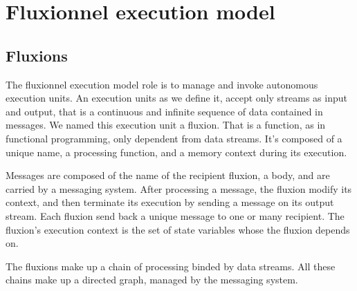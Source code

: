\section{Fluxionnel execution model}

\subsection{Fluxions}

The fluxionnel execution model role is to manage and invoke autonomous execution units.
An execution units as we define it, accept only streams as input and output, that is a continuous and infinite sequence of data contained in messages.
We named this execution unit a fluxion.
That is a function, as in functional programming, only dependent from data streams.
It's composed of a unique name, a processing function, and a memory context during its execution.

Messages are composed of the name of the recipient fluxion, a body, and are carried by a messaging system.
After processing a message, the fluxion modify its context, and then terminate its execution by sending a message on its output stream.
Each fluxion send back a unique message to one or many recipient.
The fluxion's execution context is the set of state variables whose the fluxion depends on.

The fluxions make up a chain of processing binded by data streams.
All these chains make up a directed graph, managed by the messaging system.




